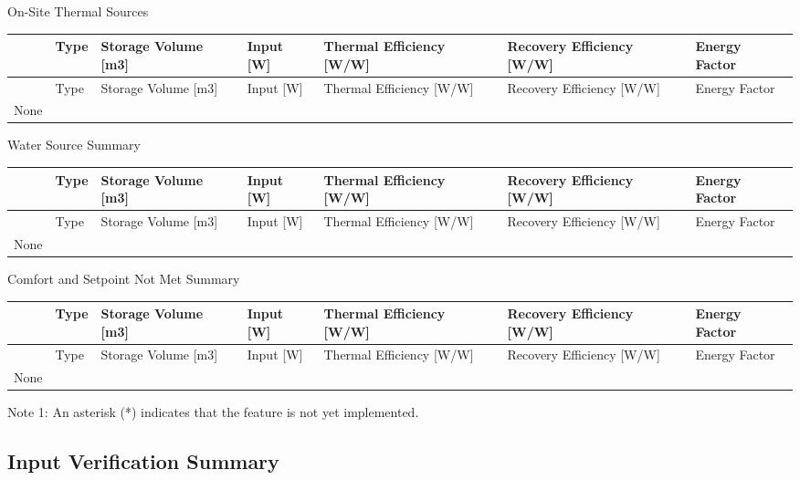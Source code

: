 On-Site Thermal Sources

\begin{longtable}[c]{p{0.85in}p{0.85in}p{0.85in}p{0.85in}p{0.85in}p{0.85in}p{0.85in}}
\toprule 
~ & Type & Storage Volume [m3] & Input [W] & Thermal Efficiency [W/W] & Recovery Efficiency [W/W] & Energy Factor \tabularnewline
\midrule
\endfirsthead

\toprule 
~ & Type & Storage Volume [m3] & Input [W] & Thermal Efficiency [W/W] & Recovery Efficiency [W/W] & Energy Factor \tabularnewline
\midrule
\endhead

None & ~ & ~ & ~ & ~ & ~ & ~ \tabularnewline
\bottomrule
\end{longtable}

Water Source Summary

\begin{longtable}[c]{p{0.85in}p{0.85in}p{0.85in}p{0.85in}p{0.85in}p{0.85in}p{0.85in}}
\toprule 
~ & Type & Storage Volume [m3] & Input [W] & Thermal Efficiency [W/W] & Recovery Efficiency [W/W] & Energy Factor \tabularnewline
\midrule
\endfirsthead

\toprule 
~ & Type & Storage Volume [m3] & Input [W] & Thermal Efficiency [W/W] & Recovery Efficiency [W/W] & Energy Factor \tabularnewline
\midrule
\endhead

None & ~ & ~ & ~ & ~ & ~ & ~ \tabularnewline
\bottomrule
\end{longtable}

Comfort and Setpoint Not Met Summary

\begin{longtable}[c]{p{0.85in}p{0.85in}p{0.85in}p{0.85in}p{0.85in}p{0.85in}p{0.85in}}
\toprule 
~ & Type & Storage Volume [m3] & Input [W] & Thermal Efficiency [W/W] & Recovery Efficiency [W/W] & Energy Factor \tabularnewline
\midrule
\endfirsthead

\toprule 
~ & Type & Storage Volume [m3] & Input [W] & Thermal Efficiency [W/W] & Recovery Efficiency [W/W] & Energy Factor \tabularnewline
\midrule
\endhead

None & ~ & ~ & ~ & ~ & ~ & ~ \tabularnewline
\bottomrule
\end{longtable}

Note 1: An asterisk (*) indicates that the feature is not yet implemented.

\subsection{Input Verification Summary}\label{input-verification-summary}

